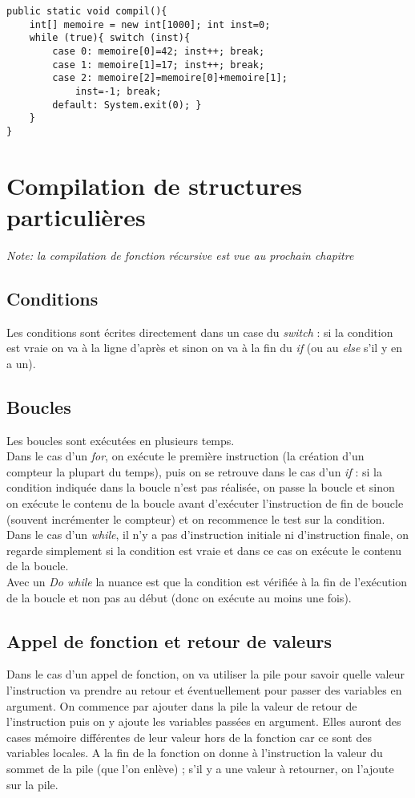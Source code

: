 \documentclass[a4paper,10pt]{book} %
\begin{document}
\begin{lstlisting}
public static void compil(){
	int[] memoire = new int[1000]; int inst=0;
	while (true){ switch (inst){
		case 0: memoire[0]=42; inst++; break;
		case 1: memoire[1]=17; inst++; break;
		case 2:	memoire[2]=memoire[0]+memoire[1];
			inst=-1; break;
		default: System.exit(0); }
	}
}
\end{lstlisting}

\section{Compilation de structures particulières}
\textit{Note: la compilation de fonction récursive est vue au prochain chapitre}
\subsection{Conditions}
Les conditions sont écrites directement dans un case du \textit{switch} : si la condition est vraie on va à la ligne d'après et sinon on va à la fin du \textit{if} (ou au \textit{else} s'il y en a un).

\subsection{Boucles}
Les boucles sont exécutées en plusieurs temps.\\

Dans le cas d'un \textit{for}, on exécute le première instruction (la création d'un compteur la plupart du temps), puis on se retrouve dans le cas d'un \textit{if} : si la condition indiquée dans la boucle n'est pas réalisée, on passe la boucle et sinon on exécute le contenu de la boucle avant d’exécuter l'instruction de fin de boucle (souvent incrémenter le compteur) et on recommence le test sur la condition.\\

Dans le cas d'un \textit{while}, il n'y a pas d'instruction initiale ni d'instruction finale, on regarde simplement si la condition est vraie et dans ce cas on exécute le contenu de la boucle.\\
Avec un \textit{Do while} la nuance est que la condition est vérifiée à la fin de l’exécution de la boucle et non pas au début (donc on exécute au moins une fois).

\subsection{Appel de fonction\label{appel:fonction} et retour de valeurs}
Dans le cas d'un appel de fonction, on va utiliser la pile pour savoir quelle valeur l'instruction va prendre au retour et éventuellement pour passer des variables en argument. On commence par ajouter dans la pile la valeur de retour de l'instruction puis on y ajoute les variables passées en argument. Elles auront des cases mémoire différentes de leur valeur hors de la fonction car ce sont des variables locales. A la fin de la fonction on donne à l'instruction la valeur du sommet de la pile (que l'on enlève) ; s'il y a une valeur à retourner, on l'ajoute sur la pile.
\end{document}
